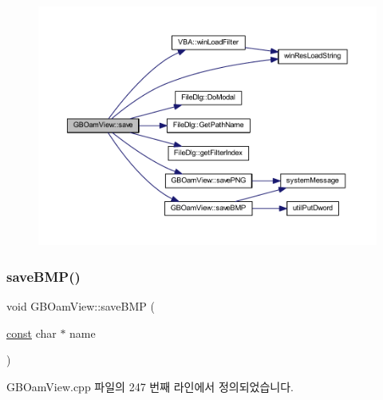 \begin{figure}[H]
\begin{center}
\leavevmode
\includegraphics[width=350pt]{class_g_b_oam_view_a04f7a345e1f9d71b149b9df3b2db30d4_cgraph}
\end{center}
\end{figure}
\mbox{\label{class_g_b_oam_view_a03a02a1b15d607e9891e58695dcfd7dc}} 
\subsubsection{\texorpdfstring{save\+B\+M\+P()}{saveBMP()}}
{\footnotesize\ttfamily void G\+B\+Oam\+View\+::save\+B\+MP (\begin{DoxyParamCaption}\item[{\mbox{\hyperlink{getopt1_8c_a2c212835823e3c54a8ab6d95c652660e}{const}} char $\ast$}]{name }\end{DoxyParamCaption})}



G\+B\+Oam\+View.\+cpp 파일의 247 번째 라인에서 정의되었습니다.


